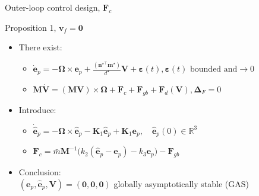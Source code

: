 \documentclass{beamer}
\begin{document}
\begin{frame}{Outer-loop control design, $\mathbf{F}_c$}
	\begin{block}{Proposition 1, $\mathbf{v}_f = \mathbf{0}$}
		\begin{itemize}
			\item There exist: \\
			\begin{itemize}
				\item $\dot {\mathbf{e}}_p = -\mathbf{\Omega}\times  \mathbf{e}_p   + \frac{(\mathbf{n}^{\star\top}\mathbf{m}^\star)}{d^\star} \mathbf{V} + \boldsymbol{\varepsilon}(t), \boldsymbol{\varepsilon}(t) \text{ bounded and}  \longrightarrow 0$
				\item 
				$\mathbf{M}\dot{\mathbf{V}} = (\mathbf{M}\mathbf{V}) \!\times\!\mathbf{\Omega} + \mathbf{F}_c + \mathbf{F}_{gb} + \mathbf{F}_d(\mathbf{V}), \mathbf{\Delta}_F = 0 $ 
			\end{itemize}
			\item Introduce: \\
			\begin{itemize}
				\item $\dot {\hat{\mathbf{e}}}_p = -\mathbf{\Omega}\times  \hat{\mathbf{e}}_p   -\mathbf{K}_1 \hat{\mathbf{e}}_p + \mathbf{K}_1 {\mathbf{e}}_p, \quad  \hat{\mathbf{e}}_p(0) \in \mathbb{R}^3$
				\item
				$\mathbf{F}_c \!=\! \bar m \mathbf{M}^{-1} \big(k_2(\hat{\mathbf{e}}_p - \mathbf{e}_p)  -  k_3 {\mathbf{e}}_p \big) - \mathbf{F}_{gb}$ 
			\end{itemize}
			\item Conclusion:\\ $(\mathbf{e}_p,{\hat{\mathbf{e}}}_p, \mathbf{V})=(\mathbf{0},\mathbf{0},\mathbf{0})$  globally asymptotically stable (GAS)			 
		\end{itemize}		
	\end{block}	
\end{frame}
\end{document}

